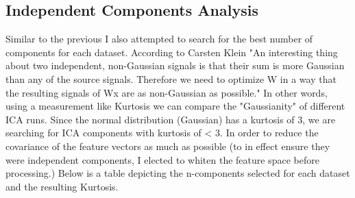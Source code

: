 \subsection{Independent Components Analysis}\label{subsec:independent-components-analysis}
Similar to the previous I also attempted to search for the best number of components for each dataset.
According to Carsten Klein\cite{klein_2019}
"An interesting thing about two independent, non-Gaussian signals is that their sum is more Gaussian than any of the source signals.
Therefore we need to optimize W in a way that the resulting signals of Wx are as non-Gaussian as possible."
In other words, using a measurement like Kurtosis we can compare the "Gaussianity" of different ICA runs.
Since the normal distribution (Gaussian) has a kurtosis of 3, we are searching for ICA components with kurtosis of < 3.
In order to reduce the covariance of the feature vectors as much as possible (to in effect ensure they were independent
components, I elected to whiten the feature space before processing.)
Below is a table depicting the n-components selected for each dataset and the resulting Kurtosis.
